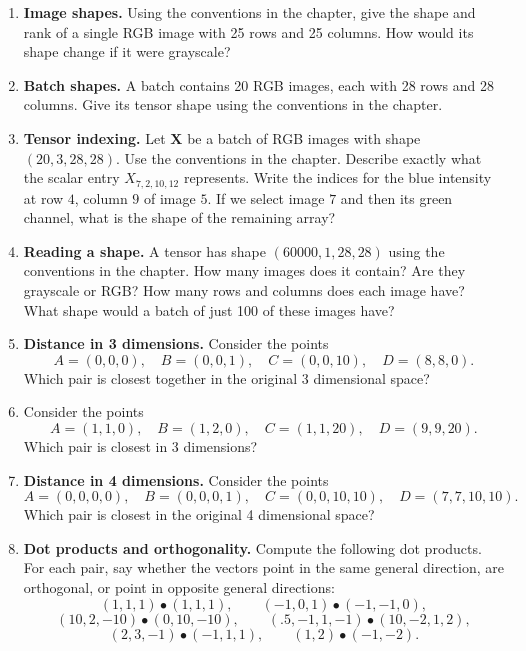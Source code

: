 \begin{enumerate}
\item \textbf{Image shapes.} Using the conventions in the chapter, give the shape and rank of a single RGB image with 25 rows and 25 columns. How would its shape change if it were grayscale?

\item \textbf{Batch shapes.} A batch contains 20 RGB images, each with 28 rows and 28 columns. Give its tensor shape using the conventions in the chapter.

\item \textbf{Tensor indexing.} Let $\mathbf{X}$ be a batch of RGB images with shape $(20,3,28,28)$. Use the conventions in the chapter. Describe exactly what the scalar entry $X_{7,2,10,12}$ represents. Write the indices for the blue intensity at row $4$, column $9$ of image $5$. If we select image $7$ and then its green channel, what is the shape of the remaining array?

\item \textbf{Reading a shape.} A tensor has shape $(60000,1,28,28)$ using the conventions in the chapter. How many images does it contain? Are they grayscale or RGB? How many rows and columns does each image have? What shape would a batch of just 100 of these images have?

\item \textbf{Distance in 3 dimensions.} Consider the points
\[
A=(0,0,0),\quad B=(0,0,1),\quad C=(0,0,10),\quad D=(8,8,0).
\]
Which pair is closest together in the original 3 dimensional space?

\item Consider the points
\[
A=(1,1,0),\quad B=(1,2,0),\quad C=(1,1,20),\quad D=(9,9,20).
\]
Which pair is closest in 3 dimensions?

\item \textbf{Distance in 4 dimensions.} Consider the points
\[
A=(0,0,0,0),\quad B=(0,0,0,1),\quad
C=(0,0,10,10),\quad D=(7,7,10,10).
\]
Which pair is closest in the original 4 dimensional space?

\item \textbf{Dot products and orthogonality.} Compute the following dot products. For each pair, say whether the vectors point in the same general direction, are orthogonal, or point in opposite general directions:
\[
(1,1,1)\bullet(1,1,1),\qquad
(-1,0,1)\bullet(-1,-1,0),
\]
\[
(10,2,-10)\bullet(0,10,-10),\qquad
(.5,-1,1,-1)\bullet(10,-2,1,2),
\]
\[
(2,3,-1)\bullet(-1,1,1),\qquad
(1,2)\bullet(-1,-2).
\]


\end{enumerate}

